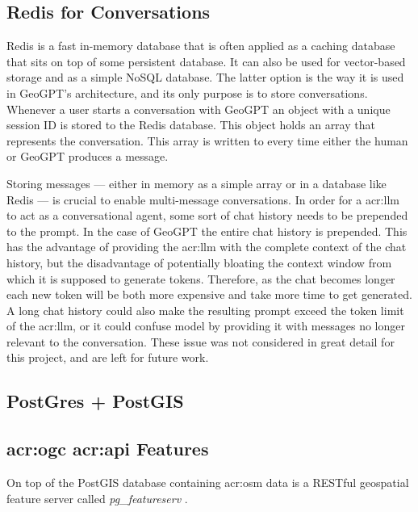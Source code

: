 \subsection{Redis for Conversations}

Redis \citep{sanfilippoRedisRealtimeData2009} is a fast in-memory database that is often applied as a caching database that sits on top of some persistent database. It can also be used for vector-based storage and as a simple NoSQL database. The latter option is the way it is used in GeoGPT's architecture, and its only purpose is to store conversations. Whenever a user starts a conversation with GeoGPT an object with a unique session ID is stored to the Redis database. This object holds an array that represents the conversation. This array is written to every time either the human or GeoGPT produces a message.

Storing messages --- either in memory as a simple array or in a database like Redis --- is crucial to enable multi-message conversations. In order for a \gls{acr:llm} to act as a conversational agent, some sort of chat history needs to be prepended to the prompt. In the case of GeoGPT the entire chat history is prepended. This has the advantage of providing the \gls{acr:llm} with the complete context of the chat history, but the disadvantage of potentially bloating the context window from which it is supposed to generate tokens. Therefore, as the chat becomes longer each new token will be both more expensive and take more time to get generated. A long chat history could also make the resulting prompt exceed the token limit of the \gls{acr:llm}, or it could confuse model by providing it with messages no longer relevant to the conversation. These issue was not considered in great detail for this project, and are left for future work.

\subsection{PostGres + PostGIS}



\subsection[OGC API Features]{\acrshort{acr:ogc} \acrshort{acr:api} Features}

On top of the PostGIS database  containing \gls{acr:osm} data is a RESTful geospatial feature server called \textit{pg\_featureserv} \citep{crunchydataCrunchyDataPg_featureserv2024}.


